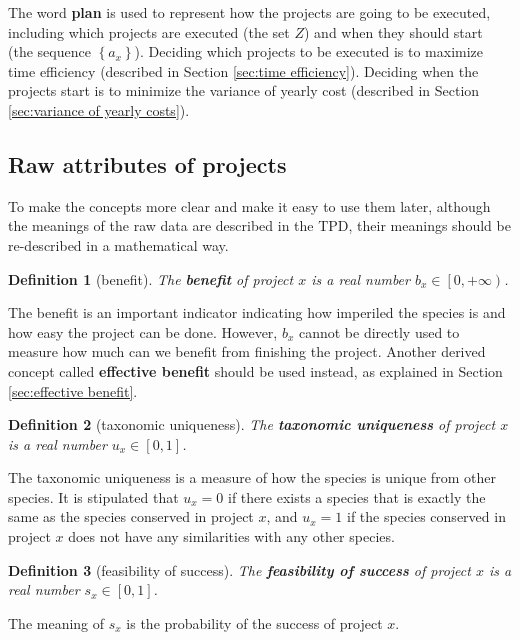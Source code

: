 \documentclass{article}
\newtheorem{definition}{Definition}
\begin{document}
The word \textbf{plan} is used to represent how the projects are going to be executed,
including which projects are executed (the set $Z$) and when they should start (the sequence $\left\{a_x\right\}$).
Deciding which projects to be executed is to maximize time efficiency (described in Section \ref{sec:time efficiency}).
Deciding when the projects start is to minimize the variance of yearly cost (described in Section \ref{sec:variance of yearly costs}).

\subsection{Raw attributes of projects}
\label{sec:raw attributes}

To make the concepts more clear and make it easy to use them later,
although the meanings of the raw data are described in the TPD,
their meanings should be re-described in a mathematical way.

\begin{definition}[benefit]
The \textbf{benefit} of project $x$ is a real number $b_x\in\left[0,+\infty\right)$.
\end{definition}

The benefit is an important indicator indicating how imperiled the species is and how easy the project can be done.
However, $b_x$ cannot be directly used to measure how much can we benefit from finishing the project.
Another derived concept called \textbf{effective benefit} should be used instead, as explained in Section \ref{sec:effective benefit}.

\begin{definition}[taxonomic uniqueness]
The \textbf{taxonomic uniqueness} of project $x$ is a real number $u_x\in\left[0,1\right]$.
\end{definition}

The taxonomic uniqueness is a measure of how the species is unique from other species.
It is stipulated that $u_x=0$ if there exists a species that is exactly the same as the species conserved in project $x$,
and $u_x=1$ if the species conserved in project $x$ does not have any similarities with any other species.

\begin{definition}[feasibility of success]
The \textbf{feasibility of success} of project $x$ is a real number $s_x\in\left[0,1\right]$.
\end{definition}

The meaning of $s_x$ is the probability of the success of project $x$.
\end{document}

